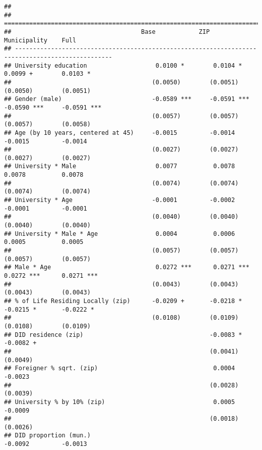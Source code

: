 \documentclass[
]{article}
\begin{document}
\begin{verbatim}
## 
## =================================================================================================
##                                    Base            ZIP             Municipality    Full          
## -------------------------------------------------------------------------------------------------
## University education                   0.0100 *        0.0104 *        0.0099 +        0.0103 *  
##                                       (0.0050)        (0.0051)        (0.0050)        (0.0051)   
## Gender (male)                         -0.0589 ***     -0.0591 ***     -0.0590 ***     -0.0591 ***
##                                       (0.0057)        (0.0057)        (0.0057)        (0.0058)   
## Age (by 10 years, centered at 45)     -0.0015         -0.0014         -0.0015         -0.0014    
##                                       (0.0027)        (0.0027)        (0.0027)        (0.0027)   
## University * Male                      0.0077          0.0078          0.0078          0.0078    
##                                       (0.0074)        (0.0074)        (0.0074)        (0.0074)   
## University * Age                      -0.0001         -0.0002         -0.0001         -0.0001    
##                                       (0.0040)        (0.0040)        (0.0040)        (0.0040)   
## University * Male * Age                0.0004          0.0006          0.0005          0.0005    
##                                       (0.0057)        (0.0057)        (0.0057)        (0.0057)   
## Male * Age                             0.0272 ***      0.0271 ***      0.0272 ***      0.0271 ***
##                                       (0.0043)        (0.0043)        (0.0043)        (0.0043)   
## % of Life Residing Locally (zip)      -0.0209 +       -0.0218 *       -0.0215 *       -0.0222 *  
##                                       (0.0108)        (0.0109)        (0.0108)        (0.0109)   
## DID residence (zip)                                   -0.0083 *                       -0.0082 +  
##                                                       (0.0041)                        (0.0049)   
## Foreigner % sqrt. (zip)                                0.0004                         -0.0023    
##                                                       (0.0028)                        (0.0039)   
## University % by 10% (zip)                              0.0005                         -0.0009    
##                                                       (0.0018)                        (0.0026)   
## DID proportion (mun.)                                                 -0.0092         -0.0013    

\end{verbatim}
\end{document}
